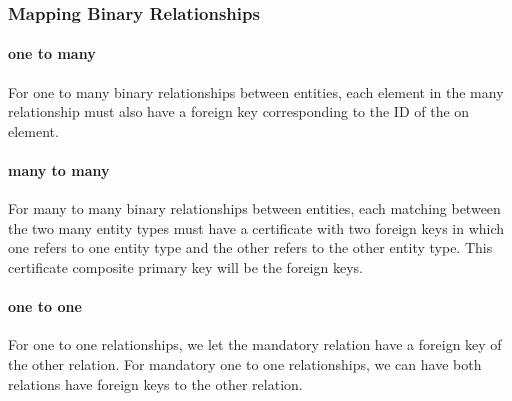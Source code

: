 \documentclass[12pt]{article}
\begin{document}
\subsubsection{Mapping Binary Relationships}

\paragraph{one to many} For one to many binary relationships between entities, each element in the many relationship must also have a foreign key corresponding to the ID of the on element.

\paragraph{many to many} For many to many binary relationships between entities, each matching between the two many entity types must have a certificate with two foreign keys in which one refers to one entity type and the other refers to the other entity type. This certificate composite primary key will be the foreign keys.

\paragraph{one to one} For one to one relationships, we let the mandatory relation have a foreign key of the other relation. For mandatory one to one relationships, we can have both relations have foreign keys to the other relation.

\newpage
\end{document}

